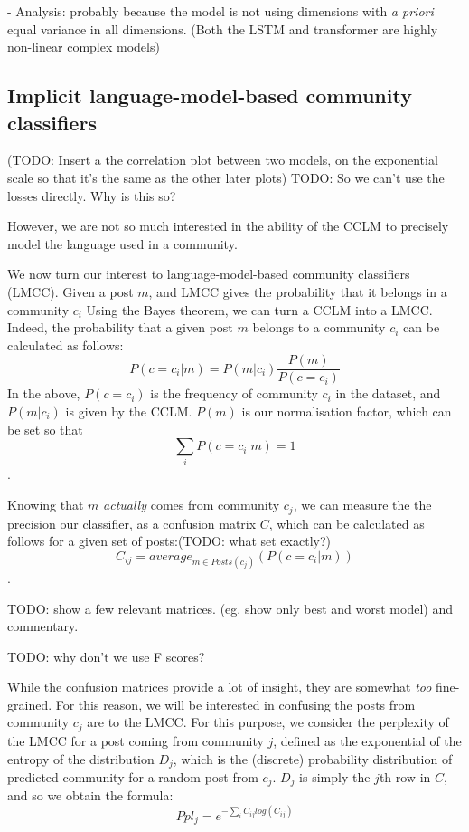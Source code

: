 \documentclass[11pt,a4paper]{article}
\begin{document}
- Analysis: probably because the model is not using dimensions
with \emph{a priori} equal variance in all dimensions. (Both the LSTM and transformer are highly non-linear complex models)

\subsection{Implicit language-model-based community classifiers}

(TODO: Insert a the correlation plot between two models, on the exponential scale so that it's the same as the other later plots)
TODO: So we can't use the losses directly. Why is this so?


However, we are not so much interested in the ability of the CCLM to
precisely model the language used in a community.

We now turn our interest to language-model-based community classifiers
(LMCC). Given a post $m$, and LMCC gives the probability that it
belongs in a community $c_i$ Using the Bayes theorem, we can turn a
CCLM into a LMCC. Indeed, the probability that a given post $m$
belongs to a community $c_i$ can be calculated as follows:
\[P(c=c_i | m) = P(m | c_i)\frac {P(m)} {P(c=c_i)}\]
In the above,
$P(c=c_i)$ is the frequency of community $c_i$ in the dataset, and
$P(m | c_i)$ is given by the CCLM. $P(m)$ is our normalisation factor, which can be set so that
\[\sum_i P(c=c_i | m) = 1\].

Knowing that $m$ \emph{actually} comes from community $c_j$, we can
measure the the precision our classifier, as a confusion matrix $C$,
which can be calculated as follows for a given set of posts:(TODO: what set exactly?)
\[C_{ij} = average_{m ∈ Posts(c_j)}(P(c=c_i | m))\].

TODO: show a few relevant matrices. (eg. show only best and worst model) and commentary.

TODO: why don't we use F scores?

While the confusion matrices provide a lot of insight, they are
somewhat \emph{too} fine-grained. For this reason, we will be
interested in confusing the posts from community $c_j$ are to the
LMCC. For this purpose, we consider the perplexity of the LMCC for a
post coming from community $j$, defined as the exponential of the
entropy of the distribution \(D_j\), which is the (discrete)
probability distribution of predicted community for a random post from
$c_j$. $D_j$ is simply the $j$th row in \(C\), and so we obtain the formula:
\[Ppl_j = e^{-\sum_i C_{ij} log(C_{ij})}\]
\end{document}
